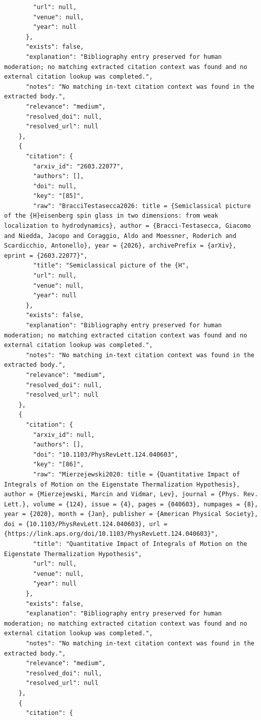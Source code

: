 \documentclass[11pt]{article}
\begin{document}
\begin{verbatim}
        "url": null,
        "venue": null,
        "year": null
      },
      "exists": false,
      "explanation": "Bibliography entry preserved for human moderation; no matching extracted citation context was found and no external citation lookup was completed.",
      "notes": "No matching in-text citation context was found in the extracted body.",
      "relevance": "medium",
      "resolved_doi": null,
      "resolved_url": null
    },
    {
      "citation": {
        "arxiv_id": "2603.22077",
        "authors": [],
        "doi": null,
        "key": "[85]",
        "raw": "BracciTestasecca2026: title = {Semiclassical picture of the {H}eisenberg spin glass in two dimensions: from weak localization to hydrodynamics}, author = {Bracci-Testasecca, Giacomo and Niedda, Jacopo and Coraggio, Aldo and Moessner, Roderich and Scardicchio, Antonello}, year = {2026}, archivePrefix = {arXiv}, eprint = {2603.22077}",
        "title": "Semiclassical picture of the {H",
        "url": null,
        "venue": null,
        "year": null
      },
      "exists": false,
      "explanation": "Bibliography entry preserved for human moderation; no matching extracted citation context was found and no external citation lookup was completed.",
      "notes": "No matching in-text citation context was found in the extracted body.",
      "relevance": "medium",
      "resolved_doi": null,
      "resolved_url": null
    },
    {
      "citation": {
        "arxiv_id": null,
        "authors": [],
        "doi": "10.1103/PhysRevLett.124.040603",
        "key": "[86]",
        "raw": "Mierzejewski2020: title = {Quantitative Impact of Integrals of Motion on the Eigenstate Thermalization Hypothesis}, author = {Mierzejewski, Marcin and Vidmar, Lev}, journal = {Phys. Rev. Lett.}, volume = {124}, issue = {4}, pages = {040603}, numpages = {8}, year = {2020}, month = {Jan}, publisher = {American Physical Society}, doi = {10.1103/PhysRevLett.124.040603}, url = {https://link.aps.org/doi/10.1103/PhysRevLett.124.040603}",
        "title": "Quantitative Impact of Integrals of Motion on the Eigenstate Thermalization Hypothesis",
        "url": null,
        "venue": null,
        "year": null
      },
      "exists": false,
      "explanation": "Bibliography entry preserved for human moderation; no matching extracted citation context was found and no external citation lookup was completed.",
      "notes": "No matching in-text citation context was found in the extracted body.",
      "relevance": "medium",
      "resolved_doi": null,
      "resolved_url": null
    },
    {
      "citation": {

\end{verbatim}
\end{document}
